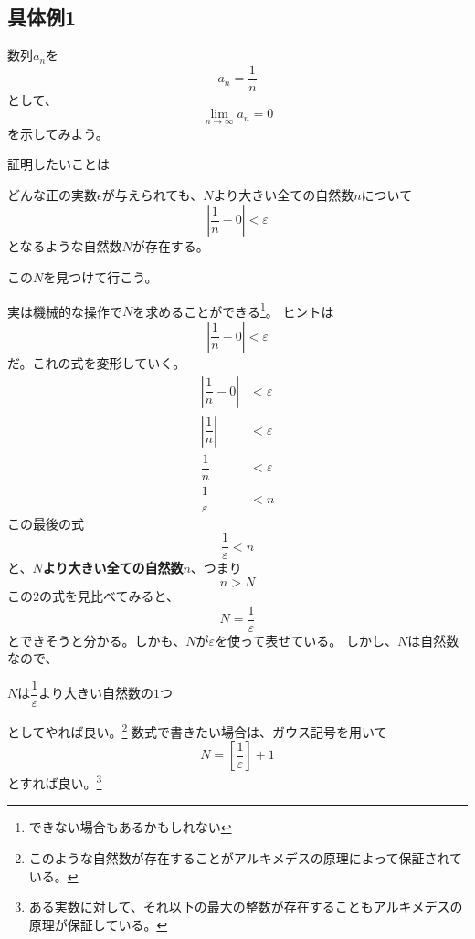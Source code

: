 \documentclass[a4paper,16pt]{jsarticle}
\begin{document}
{\subsection{具体例1}
数列$a_n$を
\begin{equation}
	a_n = \dfrac{1}{n}
\end{equation}
として、
\begin{equation}
	\lim_{n \to \infty} a_n = 0
\end{equation}
を示してみよう。

証明したいことは
\begin{oframed}
	どんな正の実数$\epsilon$が与えられても、$N$より大きい全ての自然数$n$について
	\begin{equation}
		\left|\dfrac{1}{n} - 0\right| < \varepsilon
	\end{equation}
	となるような自然数$N$が存在する。
\end{oframed}
この$N$を見つけて行こう。

実は機械的な操作で$N$を求めることができる\footnote{できない場合もあるかもしれない}。
ヒントは
\begin{equation}
	\left|\dfrac{1}{n} - 0\right| < \varepsilon \nonumber
\end{equation}
だ。これの式を変形していく。
\begin{align}
	\left|\dfrac{1}{n} - 0\right| &< \varepsilon \\
	\left|\dfrac{1}{n}\right| &< \varepsilon\\
	\dfrac{1}{n} &< \varepsilon \\
	\dfrac{1}{\varepsilon} &< n
\end{align}
この最後の式
\begin{equation}
	\dfrac{1}{\varepsilon} < n \nonumber
\end{equation}
と、{\bf$N$より大きい全ての自然数$n$}、つまり
\begin{equation}
	n > N \nonumber
\end{equation}
この$2$の式を見比べてみると、
\begin{equation}
	N = \dfrac{1}{\varepsilon} \nonumber
\end{equation}
とできそうと分かる。しかも、$N$が$\varepsilon$を使って表せている。
しかし、$N$は自然数なので、
\begin{center}
	$N$は$\dfrac{1}{\varepsilon}$より大きい自然数の$1$つ
\end{center}
としてやれば良い。\footnote{このような自然数が存在することがアルキメデスの原理によって保証されている。}
数式で書きたい場合は、ガウス記号を用いて
\begin{equation}
	N = \left[\dfrac{1}{\varepsilon}\right] + 1
\end{equation}
とすれば良い。\footnote{ある実数に対して、それ以下の最大の整数が存在することもアルキメデスの原理が保証している。}

}
\end{document}
